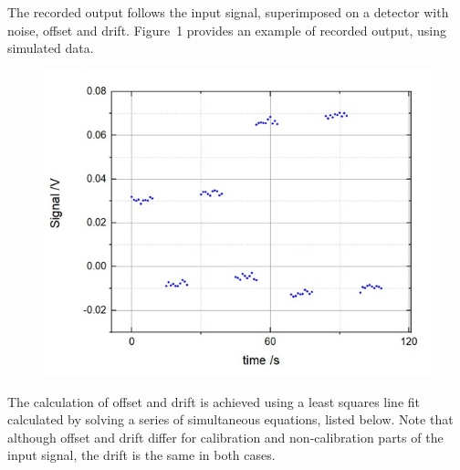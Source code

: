 \documentclass{IMEKO2024}
\begin{document}
The recorded output follows the input signal, superimposed on a detector with noise, offset and drift. Figure~1%
provides an example of recorded output, using simulated data.
\begin{figure}[H]
  \begin{center}
    \includegraphics[width=0.6\linewidth]{example_output.jpg}
    \label{fig:rec_out}
  \end{center}
\end{figure}

The calculation of offset and drift is achieved using a least squares line fit calculated by solving a series of simultaneous equations, listed below. Note that although offset and drift differ for calibration and non-calibration parts of the input signal, the drift is the same in both cases.

\end{document}

